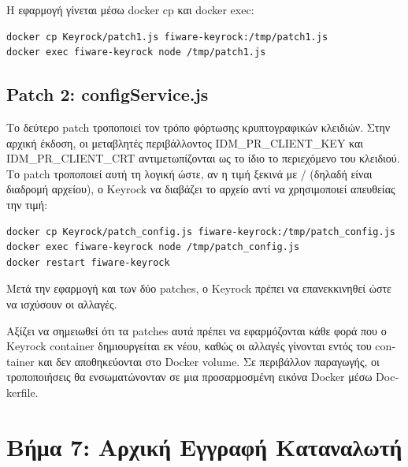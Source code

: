 Η εφαρμογή γίνεται μέσω \textlatin{docker cp} και
\textlatin{docker exec}:

\begin{lstlisting}[language=bash, caption={Applying patch1 to Keyrock.}, stringstyle=\color{black}, keywordstyle=\color{black}]
docker cp Keyrock/patch1.js fiware-keyrock:/tmp/patch1.js
docker exec fiware-keyrock node /tmp/patch1.js
\end{lstlisting}

\subsection{\textlatin{Patch 2}: \textlatin{configService.js}}
\label{subsec:patch2}

Το δεύτερο \textlatin{patch} τροποποιεί τον τρόπο φόρτωσης
κρυπτογραφικών κλειδιών. Στην αρχική έκδοση, οι μεταβλητές
περιβάλλοντος \textlatin{IDM\_PR\_CLIENT\_KEY} και
\textlatin{IDM\_PR\_CLIENT\_CRT} αντιμετωπίζονται ως το ίδιο
το περιεχόμενο του κλειδιού. Το \textlatin{patch} τροποποιεί
αυτή τη λογική ώστε, αν η τιμή ξεκινά με \textlatin{/} (δηλαδή
είναι διαδρομή αρχείου), ο \textlatin{Keyrock} να διαβάζει
το αρχείο αντί να χρησιμοποιεί απευθείας την τιμή:

\begin{lstlisting}[language=bash, caption={Applying patch2 to Keyrock.}]
docker cp Keyrock/patch_config.js fiware-keyrock:/tmp/patch_config.js
docker exec fiware-keyrock node /tmp/patch_config.js
docker restart fiware-keyrock
\end{lstlisting}

Μετά την εφαρμογή και των δύο \textlatin{patches}, ο
\textlatin{Keyrock} πρέπει να επανεκκινηθεί ώστε να ισχύσουν
οι αλλαγές.

Αξίζει να σημειωθεί ότι τα \textlatin{patches} αυτά πρέπει να
εφαρμόζονται κάθε φορά που ο \textlatin{Keyrock container}
δημιουργείται εκ νέου, καθώς οι αλλαγές γίνονται εντός του
\textlatin{container} και δεν αποθηκεύονται στο \textlatin{Docker
volume}. Σε περιβάλλον παραγωγής, οι τροποποιήσεις θα ενσωματώνονταν
σε μια προσαρμοσμένη εικόνα \textlatin{Docker} μέσω
\textlatin{Dockerfile}.

\section{Βήμα 7: Αρχική Εγγραφή Καταναλωτή}
\label{sec:step7-consumer}

